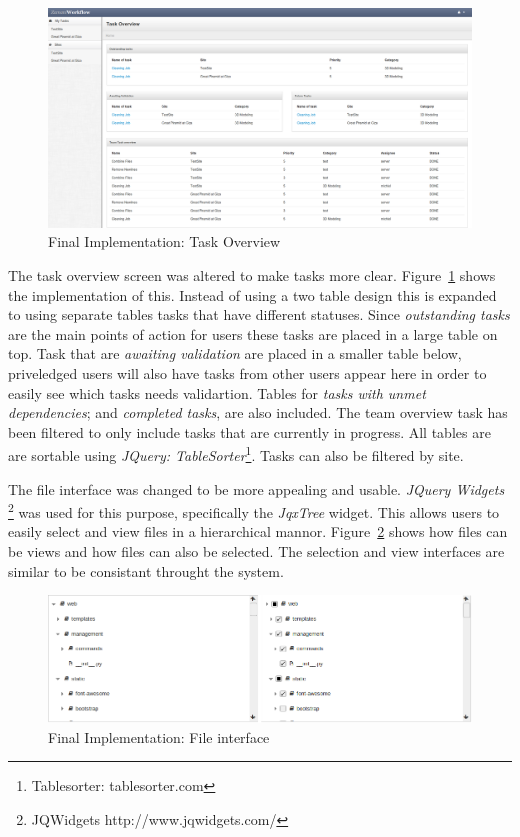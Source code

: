 \documentclass[12pt,a4paper]{report}
\begin{document}
\begin{figure}[!h]
    \begin{center}
        \includegraphics[scale=0.22]{figures/final-overview.png}
    \end{center}
    \caption{Final Implementation: Task Overview}
    \label{final:overview}
\end{figure}

The task overview screen was altered to make tasks more clear. Figure~\ref{final:overview}
shows the implementation of this. Instead of using a two table design this is expanded to
using separate tables tasks that have different statuses. Since \emph{outstanding tasks}
are the main points of action for users these tasks are placed in a large table on top.
Task that are \emph{awaiting validation} are placed in a smaller table below, priveledged
users will also have tasks from other users appear here in order to easily see which tasks
needs validartion. Tables for \emph{tasks with unmet dependencies}; and
\emph{completed tasks}, are also included. The team overview task has been filtered
to only include tasks that are currently in progress. All tables are are sortable
using \emph{JQuery: TableSorter}\footnote{Tablesorter: tablesorter.com}. Tasks can
also be filtered by site.

The file interface was changed to be more appealing and usable. \emph{JQuery Widgets}
\footnote{JQWidgets http://www.jqwidgets.com/} was used for this purpose, specifically
the \emph{JqxTree} widget. This allows users to easily select and view files in a hierarchical
mannor. Figure~\ref{final:tree_view} shows how files can be views and how files can also be
selected. The selection and view interfaces are similar to be consistant throught the system.

\begin{figure}[!h]
    \begin{center}
        \includegraphics[scale=0.45]{figures/final-interface.png}
    \end{center}
    \caption{Final Implementation: File interface}
    \label{final:tree_view}
\end{figure}
\end{document}

